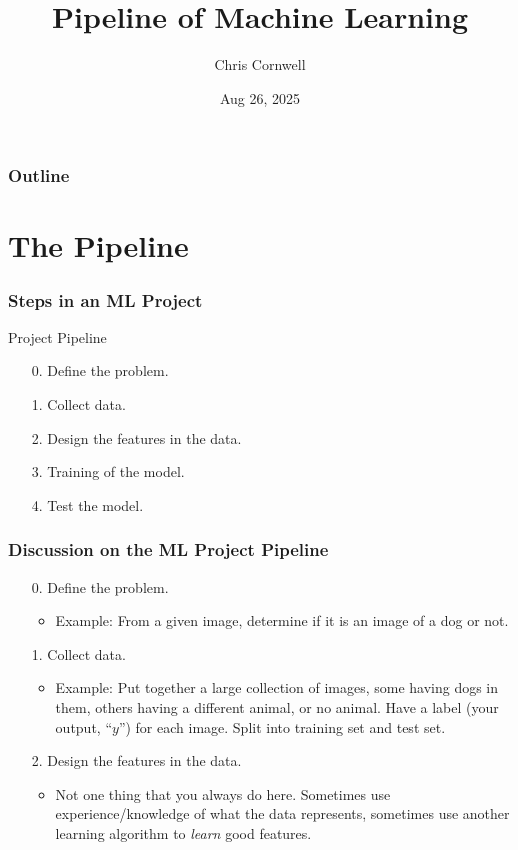 \documentclass{beamer}
\author{Chris Cornwell}
\date{Aug 26, 2025}
\title{Pipeline of Machine Learning}
\newenvironment{codeblock}
    {\hfill\begin{beamerboxesrounded}[lower=codecol, width=0.8\textwidth]
    \medskip

    }
    { 
    \end{beamerboxesrounded}\hfill
    }
\theoremstyle{example}
\newcommand{\gnum}[1]{{\color{mygreen}#1.}}
\begin{document}
\begin{frame}
\titlepage
\end{frame}

\begin{frame}
\frametitle{Outline}
\tableofcontents
\end{frame}

\section{The Pipeline}

\begin{frame}
\frametitle{Steps in an ML Project}

\begin{codeblock}

{\color{mygreen}Project Pipeline
    \begin{enumerate}
        \item[\gnum{0}] Define the problem.
        \item[\gnum{1}] Collect data.
        \item[\gnum{2}] Design the features in the data.
        \item[\gnum{3}] Training of the model.
        \item[\gnum{4}] Test the model.
    \end{enumerate}
}

\end{codeblock}

\end{frame}

\begin{frame}
\frametitle{Discussion on the ML Project Pipeline}
    \begin{enumerate}
        \item[\gnum{0}] Define the problem.
        \begin{itemize}
            \item Example: From a given image, determine if it is an image of a dog or not.
        \end{itemize}
        \pause
        \item[\gnum{1}] Collect data.
        \begin{itemize}
            \item Example: Put together a large collection of images, some having dogs in them, others having a different animal, or no animal. Have a label (your output, ``$y$'') for each image. Split into training set and test set.
        \end{itemize}
        \pause
        \item[\gnum{2}] Design the features in the data.
        \begin{itemize}
            \item Not one thing that you always do here. Sometimes use experience/knowledge of what the data represents, sometimes use another learning algorithm to \textit{learn} good features.
        \end{itemize}
    \end{enumerate}
\end{frame}
\end{document}
